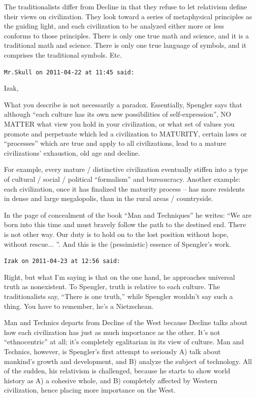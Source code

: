 \begin{footnotesize}
\begin{sffamily}
The traditionalists differ from Decline in that they refuse to let relativism define their views on civilization. They look toward a series of metaphysical principles as the guiding light, and each civilization to be analyzed either more or less conforms to those principles. There is only one true math and science, and it is a traditional math and science. There is only one true language of symbols, and it comprises the traditional symbols. Etc.

\hfill

\texttt{Mr.Skull on 2011-04-22 at 11:45 said:}

Izak,

What you describe is not necessarily a paradox. Essentially, Spengler says that although ``each culture has its own new possibilities of self-expression'', NO MATTER what view you hold in your civilization, or what set of values you promote and perpetuate which led a civilization to MATURITY, certain laws or ``processes'' which are true and apply to all civilizations, lead to a mature civilizations' exhaustion, old age and decline.

For example, every mature / distinctive civilization eventually stiffen into a type of cultural / social / political ``formalism'' and bureaucracy. Another example: each civilization, once it has finalized the maturity process -- has more residents in dense and large megalopolis, than in the rural areas / countryside.

In the page of concealment of the book ``Man and Techniques'' he writes: ``We are born into this time and must bravely follow the path to the destined end. There is not other way. Our duty is to hold on to the lost position without hope, without rescue... ''. And this is the (pessimistic) essence of Spengler's work.

\hfill

\texttt{Izak on 2011-04-23 at 12:56 said:}

Right, but what I'm saying is that on the one hand, he approaches universal truth as nonexistent. To Spengler, truth is relative to each culture. The traditionalists say, ``There is one truth,'' while Spengler wouldn't say such a thing. You have to remember, he's a Nietzschean.

Man and Technics departs from Decline of the West because Decline talks about how each civilization has just as much importance as the other. It's not ``ethnocentric'' at all; it's completely egalitarian in its view of culture. Man and Technics, however, is Spengler's first attempt to seriously A) talk about mankind's growth and development, and B) analyze the subject of technology. All of the sudden, his relativism is challenged, because he starts to show world history as A) a cohesive whole, and B) completely affected by Western civilization, hence placing more importance on the West.


\end{sffamily}
\end{footnotesize}
